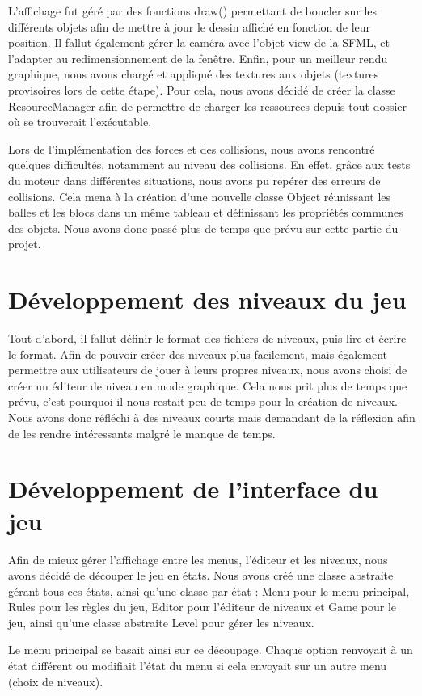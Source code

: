 \documentclass[12pt]{report}
\begin{document}
		
		L'affichage fut géré par des fonctions draw() permettant de boucler sur les différents objets afin de mettre à jour le dessin affiché en fonction de leur position. Il fallut également gérer la caméra avec l'objet view de la SFML, et l'adapter au redimensionnement de la fenêtre. Enfin, pour un meilleur rendu graphique, nous avons chargé et appliqué des textures aux objets (textures provisoires lors de cette étape). Pour cela, nous avons décidé de créer la classe ResourceManager afin de permettre de charger les ressources depuis tout dossier où se trouverait l'exécutable. 
		
		
		Lors de l'implémentation des forces et des collisions, nous avons rencontré quelques difficultés, notamment au niveau des collisions. En effet, grâce aux tests du moteur dans différentes situations, nous avons pu repérer des erreurs de collisions. Cela mena à la création d'une nouvelle classe Object réunissant les balles et les blocs dans un même tableau et définissant les propriétés communes des objets. Nous avons donc passé plus de temps que prévu sur cette partie du projet.
	
	\chapter{Développement des niveaux du jeu}
		Tout d'abord, il fallut définir le format des fichiers de niveaux, puis lire et écrire le format. Afin de pouvoir créer des niveaux plus facilement, mais également permettre aux utilisateurs de jouer à leurs propres niveaux, nous avons choisi de créer un éditeur de niveau en mode graphique. Cela nous prit plus de temps que prévu, c'est pourquoi il nous restait peu de temps pour la création de niveaux. Nous avons donc réfléchi à des niveaux courts mais demandant de la réflexion afin de les rendre intéressants malgré le manque de temps. 
		
	\chapter{Développement de l'interface du jeu}
		Afin de mieux gérer l'affichage entre les menus, l'éditeur et les niveaux, nous avons décidé de découper le jeu en états. Nous avons créé une classe abstraite gérant tous ces états, ainsi qu'une classe par état : Menu pour le menu principal, Rules pour les règles du jeu, Editor pour l'éditeur de niveaux et Game pour le  jeu, ainsi qu'une classe abstraite Level pour gérer les niveaux.
		
		
		Le menu principal se basait ainsi sur ce découpage. Chaque option renvoyait à un état différent ou modifiait l'état du menu si cela envoyait sur un autre menu (choix de niveaux).
		
\end{document}
